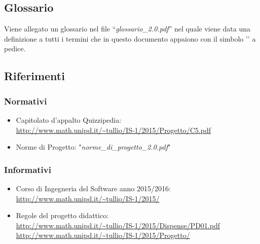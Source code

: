 \documentclass[a4paper,11pt]{article}
\begin{document}
	\subsection{Glossario}
	Viene allegato un glossario nel file ``\textit{glossario\_2.0.pdf}'' nel quale viene data una definizione a tutti i termini che in questo documento appaiono con il simbolo '\addglos' a pedice.
	\subsection{Riferimenti}
		\subsubsection{Normativi}

		\begin{itemize}
			\item Capitolato d'appalto Quizzipedia:\\
			\url{http://www.math.unipd.it/~tullio/IS-1/2015/Progetto/C5.pdf}
			\item Norme di Progetto: "\textit{norme\_di\_progetto\_2.0.pdf}"
		\end{itemize}
		\subsubsection{Informativi}
		\begin{itemize}
			\item Corso di Ingegneria del Software anno 2015/2016:\\
			\url{http://www.math.unipd.it/~tullio/IS-1/2015/}
			\item Regole del progetto didattico:\\
			\url{http://www.math.unipd.it/~tullio/IS-1/2015/Dispense/PD01.pdf}
			\url{http://www.math.unipd.it/~tullio/IS-1/2015/Progetto/}\\
		\end{itemize}
	\pagebreak
	\newpage
	
	\newpage
	
	\newpage
	
	\newpage
	
	\newpage
	
\end{document}
